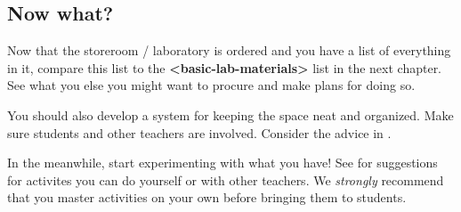 \subsection{Now what?}

Now that the storeroom / laboratory is ordered and you have a list of everything in it, compare this list to the \textbf{\textless basic-lab-materials\textgreater } list in the next chapter. See what you else you might want to procure and make plans for doing so.

You should also develop a system for keeping the space neat and organized. Make sure students and other teachers are involved. Consider the advice in .

In the meanwhile, start experimenting with what you have! See  for suggestions for activites you can do yourself or with other teachers. We \textit{strongly} recommend that you master activities on your own before bringing them to students.

%
